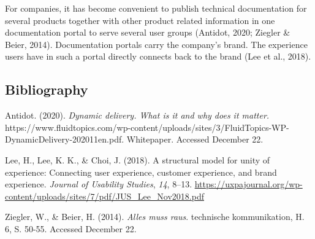 \documentclass[
]{article}
\newlength{\cslhangindent}
\newlength{\cslentryspacingunit} %
\newenvironment{CSLReferences}[2] %
 {%
  \setlength{\parindent}{0pt}
  \ifodd #1
  \let\oldpar\par
  \def\par{\hangindent=\cslhangindent\oldpar}
  \fi
  \setlength{\parskip}{#2\cslentryspacingunit}
 }%
 {}
\newcommand{\CSLBlock}[1]{#1\hfill\break}
\begin{document}
For companies, it has become convenient to publish technical
documentation for several products together with other product related
information in one documentation portal to serve several user groups
(Antidot, 2020; Ziegler \& Beier, 2014). Documentation portals carry the
company's brand. The experience users have in such a portal directly
connects back to the brand (Lee et al., 2018).

\subsection*{Bibliography}\label{bibliography}

\protect{}\label{refs}
\begin{CSLReferences}{1}{0}
Antidot. (2020). \emph{Dynamic delivery. What is it and why does it
matter.}
https://www.fluidtopics.com/wp-content/uploads/sites/3/FluidTopics-WP-DynamicDelivery-202011en.pdf.
\CSLBlock{Whitepaper. Accessed December 22.}

Lee, H., Lee, K. K., \& Choi, J. (2018). A structural model for unity of
experience: Connecting user experience, customer experience, and brand
experience. \emph{Journal of Usability Studies}, \emph{14}, 8--13.
\url{https://uxpajournal.org/wp-content/uploads/sites/7/pdf/JUS_Lee_Nov2018.pdf}

Ziegler, W., \& Beier, H. (2014). \emph{Alles muss raus}.
\CSLBlock{technische kommunikation, H. 6, S. 50-55. Accessed December
22.}

\end{CSLReferences}
\end{document}
